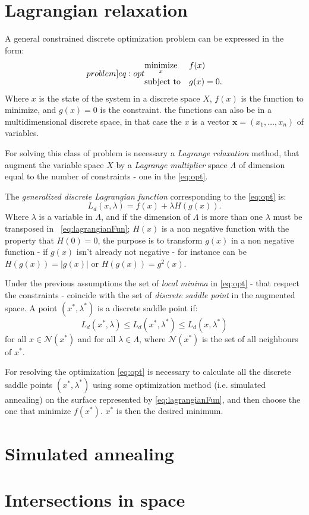 \documentclass[dissertation.tex]{subfiles}
\begin{document}
\section{Lagrangian relaxation}\label{sec:lagrangianRelaxation}
A general constrained discrete optimization problem can be expressed in
the form:
\begin{equation}\label[problem]{eq:opt}
\begin{aligned}
& \underset{x}{\text{minimize}}
& & f(x) \\
& \text{subject to}
& & g(x)=0.
\end{aligned}
\end{equation}
Where $x$ is the state of the system in a discrete space $X$, $f(x)$
is the function to
minimize, and $g(x)=0$ is the constraint. the functions can also be
in a multidimensional discrete space, in that case the $x$ is a vector
$\mathbf{x}=(x_1,\dots,x_n)$ of variables.

For solving this class
of problem is necessary a \emph{Lagrange relaxation} method, that
augment the variable space $X$ by a \emph{Lagrange multiplier} space
$\Lambda$ of dimension equal to the number of constraints - one in the
\cref{eq:opt}.

The \emph{generalized discrete Lagrangian
  function} corresponding to the \cref{eq:opt} is:
\begin{equation}\label{eq:lagrangianFun}
  L_d(x,\lambda)=f(x)+\lambda H(g(x)).
\end{equation}
Where $\lambda$ is a variable in $\Lambda$, and if the dimension of
$\Lambda$ is more than one $\lambda$ must be transposed in
~\cref{eq:lagrangianFun}; $H(x)$ is a non negative function
with the property that $H(0)=0$, the purpose is to transform $g(x)$ in
a non negative function - if $g(x)$ isn't already not negative - for
instance can be $H(g(x))=|g(x)|$ or $H(g(x))=g^2(x)$.

Under the previous assumptions the set of \emph{local minima}
in \cref{eq:opt} - that respect the constraints -  coincide
with the set of \emph{discrete saddle point}
in the augmented space. A point $(x^*,\lambda^*)$ is a discrete saddle
point if:
\begin{equation*}
  L_d(x^*,\lambda)\leq L_d(x^*,\lambda^*)\leq L_d(x,\lambda^*)
\end{equation*}
for all $x\in\mathcal{N}(x^*)$ and for all $\lambda\in\Lambda$, where
$\mathcal{N}(x^*)$ is the set of all neighbours of $x^*$.

For resolving the optimization \cref{eq:opt} is necessary to
calculate all the discrete saddle points $(x^*,\lambda^*)$ using some
optimization method (i.e. simulated annealing) on the surface
represented by
\cref{eq:lagrangianFun}, and then choose
the one that minimize $f(x^*)$. $x^*$ is then the desired minimum.

\section{Simulated annealing}

\section{Intersections in space}\label{sec:intersections}
\end{document}
